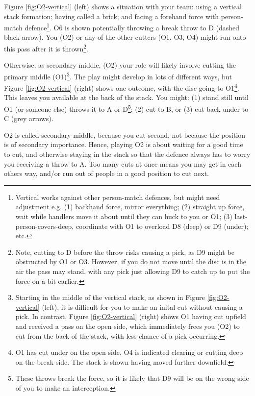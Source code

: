 \documentclass{tufte-handout}
\begin{document}
Figure \ref{fig:O2-vertical} (left) shows 
a situation 
with 
your team: 
using 
a vertical stack formation; 
having called a brick; and
facing a 
forehand force with 
person-match defence\footnote{
Vertical works
against other person-match defences, 
but might need 
adjustment e.g. 
(1) backhand force,
mirror everything;
(2) straight up force, 
wait while handlers 
move it about 
until they can huck 
to you or O1;
(3) last-person-covers-deep,
coordinate with O1 
to overload D8 (deep) 
or D9 (under); etc.}. 
O6 is shown
potentially throwing 
a break throw to D 
(dashed black arrow).
You 
(O2)
or any of the other cutters
(O1. O3, O4) 
might run onto 
this pass 
after it is thrown\footnote{
Note, cutting to D 
before the throw 
risks causing a pick, 
as D9 
might be obstructed
 by O1 
 or O3. 
 However, 
 if you do not move 
 until the disc is in the air
 the pass may stand,
 with any pick 
 just allowing 
 D9 to
 catch up 
 to put the force on 
 a bit earlier.}.


Otherwise, 
as secondary middle, 
(O2) 
your role 
will likely 
involve cutting 
the primary middle 
(O1)\footnote{
Starting
in the middle of the vertical stack,
as shown in 
Figure \ref{fig:O2-vertical} (left),
it is difficult for 
you to make 
an inital cut 
without causing 
a pick. 
In contrast, 
Figure \ref{fig:O2-vertical} (right)
shows O1 
having cut upfield 
and received 
a pass 
on the open side, 
which immediately 
frees you 
(O2) 
to cut 
from the back of the stack,
with less chance 
of a pick occurring.}.
The play might develop 
in lots of different ways, 
but
Figure \ref{fig:O2-vertical} (right) shows 
one outcome, 
with the disc going
to O1\footnote{
O1 has cut under 
on the open side.
O4 is indicated 
clearing 
or cutting 
deep on 
the break side. 
The stack is shown having 
moved further downfield.}. 
This leaves 
you 
available 
at the back of the stack. 
You might: 
(1) stand still until O1
(or someone else)  
throws it 
to A 
or D\footnote{
These throws  
break the force, 
so it is likely 
that D9 will 
be on the wrong side 
of you to make an interception.};
(2) cut to B, 
or (3) cut 
back under 
to C 
(grey arrows).  

O2 is called secondary middle, 
because you cut second, 
not because the position 
is of secondary importance. 
Hence, 
playing 
O2 is about 
waiting for a 
good time to cut,
and otherwise 
staying in the stack 
so that the defence 
always has to worry 
you receiving 
a throw to A. 
Too many cuts at once 
means you may 
get in each others way, 
and/or run out of people
in a good position 
to cut next.  
\end{document}
